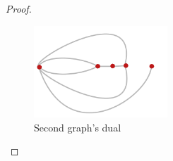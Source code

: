 \begin{proof}
    \begin{figure}[H]
        \begin{center}
        \includegraphics[width=5cm]{Test2/Problem10/Figure1_28_dual.png}
        \end{center}                            
        \caption{Second graph's dual}
        \label{t2:p10_Figure1_28_dual.png}                        
    \end{figure}\pn    
\end{proof}